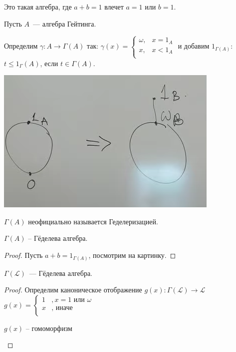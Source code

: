 \begin{definition}   
    Это такая алгебра, где $a + b = 1$ влечет $a = 1$ или $b = 1$.
\end{definition}

\begin{definition}
    [$\Gamma (A)$]
    Пусть $A$~--- алгебра Гейтинга.

    Определим $\gamma: A \to \Gamma(A)$ так:
    $\gamma(x) = \begin{cases}
        \omega, &x = 1_A\\
        x, & x < 1_A\\
    \end{cases}$
    и добавим $1_{\Gamma(A)}$: $t \leqslant 1_\Gamma(A)$, если $t \in \Gamma(A)$.

    \begin{center}
        \includegraphics[scale=0.5]{img/gedelerisation.png}
    \end{center}
\end{definition}

\begin{remark}
    $\Gamma (A)$ неофициально называется Геделеризацией.
\end{remark}

\begin{theorem}
  $\Gamma(A)$ -- Гёделева алгебра.
\end{theorem}
\begin{proof}
    Пусть $a+b = 1_{\Gamma(A)}$, посмотрим на картинку.
\end{proof}

\begin{statement}
    $\Gamma(\mathcal L)$~--- Гёделева алгебра.
\end{statement}
\begin{proof}
    Определим каноническое отображение $g(x): \Gamma(\mathcal L) \to \mathcal L$\\
    $g(x) = \begin{cases}
        1&, x = 1 \text{ или } \omega\\
        x&, \text{ иначе}\\
    \end{cases} $
    \begin{statement}
        $g(x)$ -- гомоморфизм
    \end{statement}

\end{proof}

